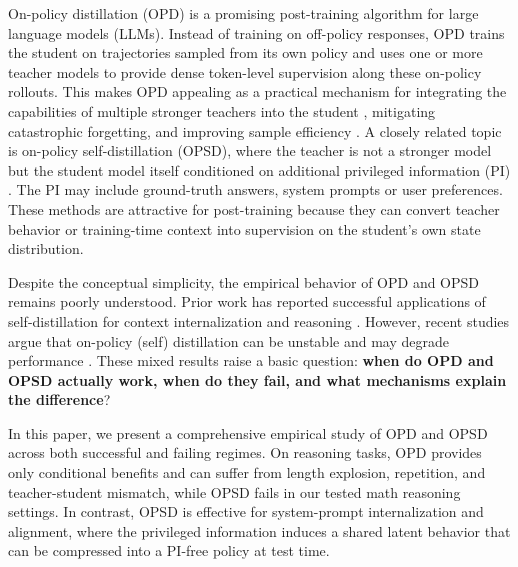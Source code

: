 On-policy distillation (OPD) \cite{agarwal2024onpolicydistillationlanguagemodels, gu2026minillmonpolicydistillationlarge} is a promising post-training
algorithm for large language models (LLMs). Instead of training on off-policy responses, OPD trains the student on trajectories sampled from
its own policy and uses one or more teacher models to provide dense token-level supervision
along these on-policy rollouts. This makes OPD appealing as a practical mechanism
for integrating the capabilities of multiple stronger teachers into the student \cite{deepseekai2026deepseekv4, coreteam2026mimov2flashtechnicalreport}, mitigating
catastrophic forgetting, and improving sample efficiency \cite{lu2025onpolicydistillation, shenfeld2026selfdistillationenablescontinuallearning}. A closely related topic is on-policy self-distillation (OPSD), where the teacher is not a stronger model but the student model itself conditioned on
additional privileged information (PI) \cite{zhao2026selfdistilledreasoneronpolicyselfdistillation, sang2026onpolicyselfdistillationreasoningcompression,ye2026onpolicycontextdistillationlanguage}. The PI may include ground-truth answers, system prompts or user preferences. These methods are attractive for post-training because they can convert teacher behavior or training-time context into supervision on the student’s own state distribution.





Despite the conceptual simplicity, the empirical behavior of OPD and OPSD remains
poorly understood. Prior work has reported successful applications of
self-distillation for context internalization and reasoning \cite{zhao2026selfdistilledreasoneronpolicyselfdistillation, sang2026onpolicyselfdistillationreasoningcompression, ye2026onpolicycontextdistillationlanguage}. However, recent studies argue that
on-policy (self) distillation can be unstable and may degrade
performance \cite{fu2026revisitingonpolicydistillationempirical,  kim2026doesselfdistillationsometimesdegrade}. These mixed results raise a basic question: \textbf{when do OPD and OPSD
actually work, when do they fail, and what mechanisms explain the difference}?

In this paper, we present a comprehensive empirical study of OPD and OPSD across
both successful and failing regimes. On reasoning tasks, OPD provides only
conditional benefits and can suffer from length explosion, repetition, and
teacher-student mismatch, while OPSD fails in our tested math reasoning
settings. In contrast, OPSD is effective for system-prompt internalization and
alignment, where the privileged information induces a shared latent behavior that can be compressed into a PI-free policy at test time.


